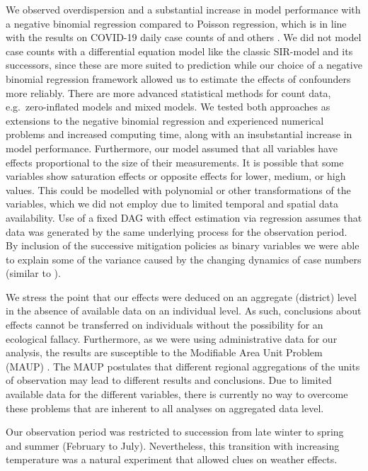 \documentclass[]{elsarticle} %
\begin{document}
We observed overdispersion and a substantial increase in model performance with a negative binomial regression compared to Poisson regression, which is in line with the results on COVID-19 daily case counts of \citet{kraemer_effect_2020} and others \citep{liu_impact_2020, bannister-tyrrell_preliminary_2020, Islamm2743}. We did not model case counts with a differential equation model like the classic SIR-model \citep{kermack1991contributions} and its successors, since these are more suited to prediction \citep[e.g.~][]{rkimodellierung} while our choice of a negative binomial regression framework allowed us to estimate the effects of confounders more reliably. There are more advanced statistical methods for count data, e.g.~zero-inflated models and mixed models. We tested both approaches as extensions to the negative binomial regression and experienced numerical problems and increased computing time, along with an insubstantial increase in model performance. Furthermore, our model assumed that all variables have effects proportional to the size of their measurements. It is possible that some variables show saturation effects or opposite effects for lower, medium, or high values. This could be modelled with polynomial or other transformations of the variables, which we did not employ due to limited temporal and spatial data availability. Use of a fixed DAG with effect estimation via regression assumes that data was generated by the same underlying process for the observation period. By inclusion of the successive mitigation policies as binary variables we were able to explain some of the variance caused by the changing dynamics of case numbers (similar to \citep{Islamm2743}).

We stress the point that our effects were deduced on an aggregate (district) level in the absence of available data on an individual level. As such, conclusions about effects cannot be transferred on individuals without the possibility for an ecological fallacy. Furthermore, as we were using administrative data for our analysis, the results are susceptible to the Modifiable Area Unit Problem (MAUP) \citep{Openshaw1984}. The MAUP postulates that different regional aggregations of the units of observation may lead to different results and conclusions. Due to limited available data for the different variables, there is currently no way to overcome these problems that are inherent to all analyses on aggregated data level.

Our observation period was restricted to succession from late winter to spring and summer (February to July). Nevertheless, this transition with increasing temperature was a natural experiment that allowed clues on weather effects.
\end{document}
